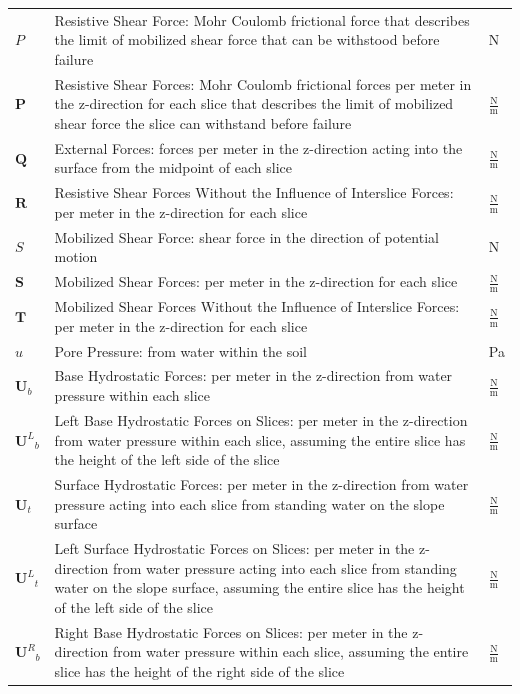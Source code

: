 \documentclass[12pt]{article}
\begin{document}
\begin{longtabu}{l X[l] l}
$P$ & Resistive Shear Force: Mohr Coulomb frictional force that describes the limit of mobilized shear force that can be withstood before failure & N
\\
$\mathbf{P}$ & Resistive Shear Forces: Mohr Coulomb frictional forces per meter in the z-direction for each slice that describes the limit of mobilized shear force the slice can withstand before failure & $\frac{\text{N}}{\text{m}}$
\\
$\mathbf{Q}$ & External Forces: forces per meter in the z-direction acting into the surface from the midpoint of each slice & $\frac{\text{N}}{\text{m}}$
\\
$\mathbf{R}$ & Resistive Shear Forces Without the Influence of Interslice Forces: per meter in the z-direction for each slice & $\frac{\text{N}}{\text{m}}$
\\
$S$ & Mobilized Shear Force: shear force in the direction of potential motion & N
\\
$\mathbf{S}$ & Mobilized Shear Forces: per meter in the z-direction for each slice & $\frac{\text{N}}{\text{m}}$
\\
$\mathbf{T}$ & Mobilized Shear Forces Without the Influence of Interslice Forces: per meter in the z-direction for each slice & $\frac{\text{N}}{\text{m}}$
\\
$u$ & Pore Pressure: from water within the soil & Pa
\\
${\mathbf{U}_{b}}$ & Base Hydrostatic Forces: per meter in the z-direction from water pressure within each slice & $\frac{\text{N}}{\text{m}}$
\\
${{\mathbf{U}^{L}}_{b}}$ & Left Base Hydrostatic Forces on Slices: per meter in the z-direction from water pressure within each slice, assuming the entire slice has the height of the left side of the slice & $\frac{\text{N}}{\text{m}}$
\\
${\mathbf{U}_{t}}$ & Surface Hydrostatic Forces: per meter in the z-direction from water pressure acting into each slice from standing water on the slope surface & $\frac{\text{N}}{\text{m}}$
\\
${{\mathbf{U}^{L}}_{t}}$ & Left Surface Hydrostatic Forces on Slices: per meter in the z-direction from water pressure acting into each slice from standing water on the slope surface, assuming the entire slice has the height of the left side of the slice & $\frac{\text{N}}{\text{m}}$
\\
${{\mathbf{U}^{R}}_{b}}$ & Right Base Hydrostatic Forces on Slices: per meter in the z-direction from water pressure within each slice, assuming the entire slice has the height of the right side of the slice & $\frac{\text{N}}{\text{m}}$

\end{longtabu}
\end{document}
